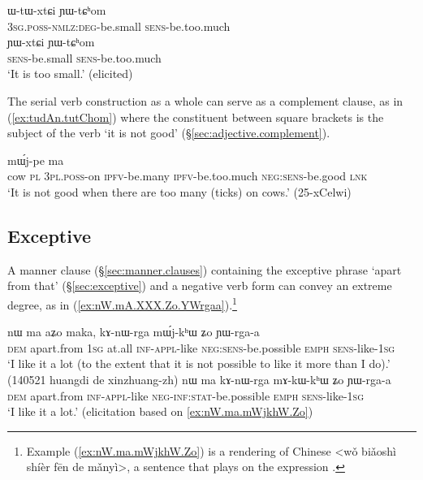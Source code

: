 \begin{exe}
\ex 
\begin{xlist}
\ex  \label{ex:WtWxtCi.YWtChom}
\gll ɯ-tɯ-xtɕi ɲɯ-tɕʰom \\
\textsc{3sg}.\textsc{poss}-\textsc{nmlz}:\textsc{deg}-be.small \textsc{sens}-be.too.much \\
\ex  \label{ex:YWxtCi.YWtChom}
\gll ɲɯ-xtɕi ɲɯ-tɕʰom \\
\textsc{sens}-be.small \textsc{sens}-be.too.much \\
\glt `It is too small.' (elicited)
\end{xlist}
\end{exe}

The serial verb construction as a whole can serve as a complement clause, as in (\ref{ex:tudAn.tutChom}) where the constituent between square brackets is the subject of the verb  `it is not good' (§\ref{sec:adjective.complement}).

\begin{exe}
\ex \label{ex:tudAn.tutChom}
 mɯ́j-pe ma \\
cow \textsc{pl} \textsc{3pl}.\textsc{poss}-on \textsc{ipfv}-be.many \textsc{ipfv}-be.too.much \textsc{neg}:\textsc{sens}-be.good \textsc{lnk} \\
\glt `It is not good when there are too many (ticks) on cows.' (25-xCelwi)
\end{exe}

\subsection{Exceptive}
A manner clause (§\ref{sec:manner.clauses}) containing the exceptive phrase  `apart from that' (§\ref{sec:exceptive}) and a negative verb form can convey an extreme degree, as in (\ref{ex:nW.mA.XXX.Zo.YWrgaa}).\footnote{Example (\ref{ex:nW.ma.mWjkhW.Zo}) is a rendering of Chinese  <wǒ biǎoshì shíèr fēn de mǎnyì>, a sentence that plays on the expression . 
}

\begin{exe}
\ex \label{ex:nW.mA.XXX.Zo.YWrgaa}
\begin{xlist}
\ex \label{ex:nW.ma.mWjkhW.Zo}
\gll  nɯ ma aʑo maka, kɤ-nɯ-rga mɯ́j-kʰɯ ʑo ɲɯ-rga-a \\
\textsc{dem} apart.from \textsc{1sg} at.all \textsc{inf}-\textsc{appl}-like \textsc{neg}:\textsc{sens}-be.possible \textsc{emph} \textsc{sens}-like-\textsc{1sg} \\
\glt `I like it a lot (to the extent that it is not possible to like it more than I do).' (140521 huangdi de xinzhuang-zh)
\ex \label{ex:nW.ma.mAkWkhW.Zo}
\gll  nɯ ma kɤ-nɯ-rga mɤ-kɯ-kʰɯ ʑo ɲɯ-rga-a \\
\textsc{dem} apart.from \textsc{inf}-\textsc{appl}-like \textsc{neg}-\textsc{inf}:\textsc{stat}-be.possible \textsc{emph} \textsc{sens}-like-\textsc{1sg} \\
\glt `I like it a lot.' (elicitation based on \ref{ex:nW.ma.mWjkhW.Zo})
\end{xlist}
\end{exe}

